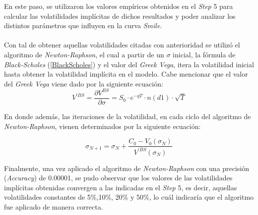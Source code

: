 \noindent En este paso, se utilizaron los valores empíricos obtenidos en el \textit{Step} 5 para calcular las volatilidades implícitas de dichos resultados y poder analizar los distintos parámetros que influyen en la curva \textit{Smile}.\\\\
\noindent Con tal de obtener aquellas volatilidades citadas con anterioridad se utilizó el algoritmo de \textit{Newton-Raphson}, el cual a partir de un $\sigma$ inicial, la fórmula de \textit{Black-Scholes} (\ref{BlackScholes}) y el valor del \textit{Greek Vega}, itera la volatilidad inicial hasta obtener la volatilidad implícita en el modelo. Cabe mencionar que el valor del \textit{Greek Vega} viene dado por la siguiente ecuación:
\begin{equation}
       V^{'BS}=\frac{\partial V^{BS}}{\partial \sigma} = S_0 \cdot e^{-qT} \cdot n(d1) \cdot \sqrt{T}
       \label{vega}
\end{equation}

\noindent En donde además, las iteraciones de la volatilidad, en cada ciclo del algoritmo de \textit{Newton-Raphson}, vienen determinados por la siguiente ecuación:

\begin{equation}
    \sigma_{N+1}=\sigma_N + \frac{C_0-V_0(\sigma_N)}{V^{'BS}(\sigma_N)}
\end{equation}

\noindent Finalmente, una vez aplicado el algoritmo de \textit{Newton-Raphson} con una precisión (\textit{Accuracy})  de 0.00001, se pudo observar que los valores de las volatilidades implícitas obtenidas convergen a las indicadas en el \textit{Step} 5, es decir, aquellas volatilidades  constantes de 5\%,10\%, 20\% y 50\%, lo cuál indicaría que el algoritmo fue aplicado de manera correcta.
\newpage
